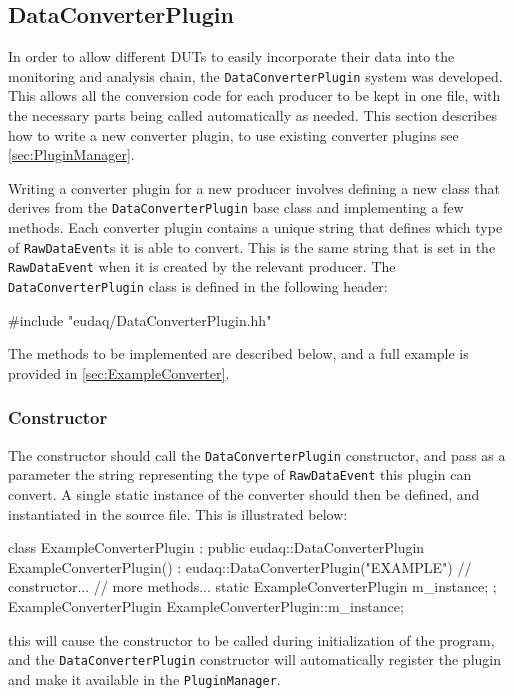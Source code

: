 \subsection{DataConverterPlugin}
In order to allow different \glspl{DUT} to easily incorporate their data into the monitoring and analysis chain,
the \texttt{DataConverterPlugin} system was developed.
This allows all the conversion code for each producer to be kept in one file,
with the necessary parts being called automatically as needed.
This section describes how to write a new converter plugin,
to use existing converter plugins see \autoref{sec:PluginManager}.

Writing a converter plugin for a new producer involves defining a new class
that derives from the \texttt{DataConverterPlugin} base class and implementing a few methods.
Each converter plugin contains a unique string that defines
which type of \texttt{RawDataEvent}s it is able to convert.
This is the same string that is set in the \texttt{RawDataEvent} when it is created by the relevant producer.
The \texttt{DataConverterPlugin} class is defined in the following header:
\begin{listing}
#include "eudaq/DataConverterPlugin.hh"
\end{listing}

The methods to be implemented are described below,
and a full example is provided in \autoref{sec:ExampleConverter}.

\subsubsection{Constructor}
The constructor should call the \texttt{DataConverterPlugin} constructor, and pass as a parameter the
string representing the type of \texttt{RawDataEvent} this plugin can convert.
A single static instance of the converter should then be defined,
and instantiated in the source file.
This is illustrated below:
\begin{listing}[C++]
class ExampleConverterPlugin : public eudaq::DataConverterPlugin {
  ExampleConverterPlugin() : eudaq::DataConverterPlugin("EXAMPLE") {
    // constructor...
  }
  // more methods...
  static ExampleConverterPlugin m_instance;
};
ExampleConverterPlugin ExampleConverterPlugin::m_instance;
\end{listing}

this will cause the constructor to be called during initialization of the program,
and the \texttt{DataConverterPlugin} constructor will automatically register the plugin
and make it available in the \texttt{PluginManager}.

